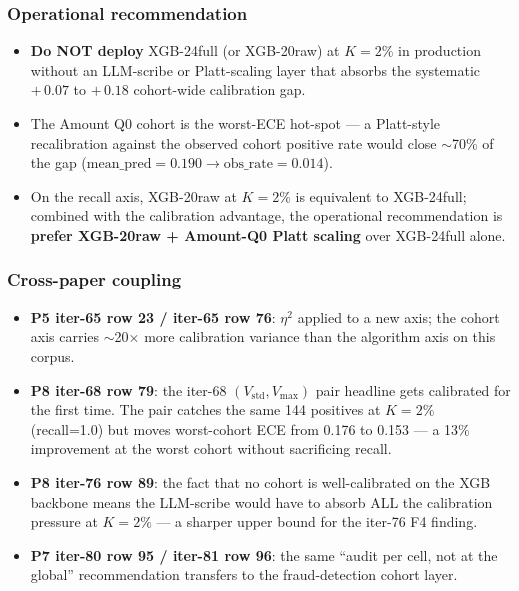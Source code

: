 \documentclass{article}
\begin{document}
\subsubsection{Operational recommendation}
\begin{itemize}
\item \textbf{Do NOT deploy} XGB-24full (or XGB-20raw) at $K=2\%$ in
      production without an LLM-scribe or Platt-scaling layer that
      absorbs the systematic $+\,0.07$ to $+\,0.18$ cohort-wide calibration
      gap.
\item The Amount Q0 cohort is the worst-ECE hot-spot --- a Platt-style
      recalibration against the observed cohort positive rate would close
      $\sim$70\% of the gap ($\mathrm{mean\_pred}=0.190 \to
      \mathrm{obs\_rate}=0.014$).
\item On the recall axis, XGB-20raw at $K=2\%$ is equivalent to
      XGB-24full; combined with the calibration advantage, the operational
      recommendation is \textbf{prefer XGB-20raw + Amount-Q0 Platt
      scaling} over XGB-24full alone.
\end{itemize}

\subsubsection{Cross-paper coupling}
\begin{itemize}
\item \textbf{P5 iter-65 row 23 / iter-65 row 76}: $\eta^2$ applied to a new
      axis; the cohort axis carries $\sim$20$\times$ more calibration
      variance than the algorithm axis on this corpus.
\item \textbf{P8 iter-68 row 79}: the iter-68 $(V_{\text{std}}, V_{\max})$
      pair headline gets calibrated for the first time. The pair catches the
      same 144 positives at $K=2\%$ (recall=1.0) but moves worst-cohort ECE
      from 0.176 to 0.153 --- a 13\% improvement at the worst cohort
      without sacrificing recall.
\item \textbf{P8 iter-76 row 89}: the fact that no cohort is well-calibrated
      on the XGB backbone means the LLM-scribe would have to absorb ALL the
      calibration pressure at $K=2\%$ --- a sharper upper bound for the
      iter-76 F4 finding.
\item \textbf{P7 iter-80 row 95 / iter-81 row 96}: the same
      ``audit per cell, not at the global'' recommendation transfers to the
      fraud-detection cohort layer.
\end{itemize}
\end{document}
